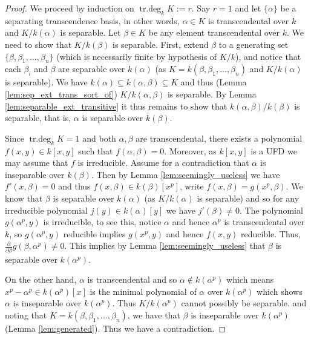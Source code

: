 \documentclass[12pt]{article}
\theoremstyle{plain}
\theoremstyle{definition}
\begin{document}
	\begin{proof}
		We proceed by induction on $\operatorname{tr.deg}_kK := r$. Say $r = 1$ and let $\lbrace \alpha \rbrace$ be a separating transcendence basis, in other words, $\alpha \in K$ is transcendental over $k$ and $K/k(\alpha)$ is separable. Let $\beta \in K$ be any element transcendental over $k$. We need to show that $K/k(\beta)$ is separable. First, extend $\beta$ to a generating set $\lbrace \beta, \beta_1,...,\beta_n\rbrace$ (which is necessarily finite by hypothesis of $K/k$), and notice that each $\beta_i$ and $\beta$ are separable over $k(\alpha)$ (as $K = k(\beta,\beta_1,...,\beta_n)$ and $K/k(\alpha)$ is separable). We have $k(\alpha) \subseteq k(\alpha,\beta) \subseteq K$ and thus (Lemma \ref{lem:sep_ext_trans_sort_of}) $K/k(\alpha,\beta)$ is separable. By Lemma \ref{lem:separable_ext_transitive} it thus remains to show that $k(\alpha,\beta)/k(\beta)$ is separable, that is, $\alpha$ is separable over $k(\beta)$.
		
		Since $\operatorname{tr.deg}_kK = 1$ and both $\alpha, \beta$ are transcendental, there exists a polynomial $f(x,y) \in k[x,y]$ such that $f(\alpha,\beta) = 0$. Moreover, as $k[x,y]$ is a UFD we may assume that $f$ is irreducible. Assume for a contradiction that $\alpha$ is inseparable over $k(\beta)$. Then by Lemma \ref{lem:seemingly_useless} we have $f'(x,\beta) = 0$ and thus $f(x,\beta) \in k(\beta)[x^p]$, write $f(x,\beta) = g(x^p,\beta)$. We know that $\beta$ is separable over $k(\alpha)$ (as $K/k(\alpha)$ is separable) and so for any irreducible polynomial $j(y) \in k(\alpha)[y]$ we have $j'(\beta) \neq 0$. The polynomial $g(\alpha^p,y)$ is irreducible, to see this, notice $\alpha$ and hence $\alpha^p$ is transcendental over $k$, so $g(\alpha^p, y)$ reducible implies $g(x^p,y)$ and hence $f(x,y)$ reducible. Thus, $\frac{\partial}{\partial\beta}g(\beta,\alpha^p) \neq 0$. This implies by Lemma \ref{lem:seemingly_useless} that $\beta$ is separable over $k(\alpha^p)$.
		
		On the other hand, $\alpha$ is transcendental and so $\alpha \not\in k(\alpha^p)$ which means $x^p - \alpha^p \in k(\alpha^p)[x]$ is the minimal polynomial of $\alpha$ over $k(\alpha^p)$ which shows $\alpha$ is inseparable over $k(\alpha^p)$. Thus $K/k(\alpha^p)$ cannot possibly be separable.  and noting that $K = k(\beta,\beta_1,...,\beta_n)$, we have that $\beta$ is inseparable over $k(\alpha^p)$ (Lemma \ref{lem:generated}). Thus we have a contradiction.
		

\end{proof}
\end{document}
